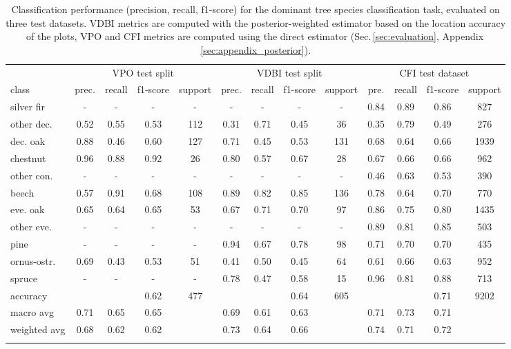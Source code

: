 \documentclass[essd, manuscript]{copernicus}
\begin{document}
\begin{table}[t]
\caption{Classification performance (precision, recall, f1-score) for the dominant tree species classification task, evaluated on three test datasets. VDBI metrics are computed with the posterior-weighted estimator based on the location accuracy of the plots, VPO and CFI metrics are computed using the direct estimator (Sec.\,\ref{sec:evaluation}, Appendix\,\ref{sec:appendix_posterior}).}
\label{tab:classification_report}
\begin{tabular}{l cccc cccc cccc}
\tophline
 & \multicolumn{4}{c}{VPO test split} & \multicolumn{4}{c}{VDBI test split} & \multicolumn{4}{c}{CFI test dataset} \\
\cline{2-5} \cline{6-9} \cline{10-13}
class & prec. & recall & f1-score & support & prec. & recall & f1-score & support & pre. & recall & f1-score & support \\
\middlehline
silver fir   & - & - & - & - & - & - & - & - & 0.84 & 0.89 & 0.86 & 827 \\
other dec.   & 0.52 & 0.55 & 0.53 & 112 & 0.31 & 0.71 & 0.45 & 36 & 0.35 & 0.79 & 0.49 & 276 \\
dec. oak     & 0.88 & 0.46 & 0.60 & 127 & 0.71 & 0.45 & 0.53 & 131 & 0.68 & 0.64 & 0.66 & 1939 \\
chestnut     & 0.96 & 0.88 & 0.92 & 26 & 0.80 & 0.57 & 0.67 & 28 & 0.67 & 0.66 & 0.66 & 962 \\
other con.   & - & - & - & - & - & - & - & - & 0.46 & 0.63 & 0.53 & 390 \\
beech        & 0.57 & 0.91 & 0.68 & 108 & 0.89 & 0.82 & 0.85 & 136 & 0.78 & 0.64 & 0.70 & 770 \\
eve. oak     & 0.65 & 0.64 & 0.65 & 53 & 0.67 & 0.71 & 0.70 & 97 & 0.86 & 0.75 & 0.80 & 1435 \\
other eve.   & - & - & - & - & - & - & - & - & 0.89 & 0.81 & 0.85 & 503 \\
pine         & - & - & - & - & 0.94 & 0.67 & 0.78 & 98 & 0.71 & 0.70 & 0.70 & 435 \\
ornus-ostr.  & 0.69 & 0.43 & 0.53 & 51 & 0.41 & 0.50 & 0.45 & 64 & 0.61 & 0.66 & 0.63 & 952 \\
spruce       & - & - & - & - & 0.78 & 0.47 & 0.58 & 15 & 0.96 & 0.81 & 0.88 & 713 \\
\middlehline
accuracy     &      &      & 0.62 & 477 &      &      & 0.64 & 605 &      &      & 0.71 & 9202 \\
macro avg    & 0.71 & 0.65 & 0.65 &  & 0.69 & 0.61 & 0.63 &  & 0.71 & 0.73 & 0.71 &  \\
weighted avg & 0.68 & 0.62 & 0.62 &  & 0.73 & 0.64 & 0.66 &  & 0.74 & 0.71 & 0.72 &  \\
\bottomhline
\end{tabular}
\end{table}
\end{document}
